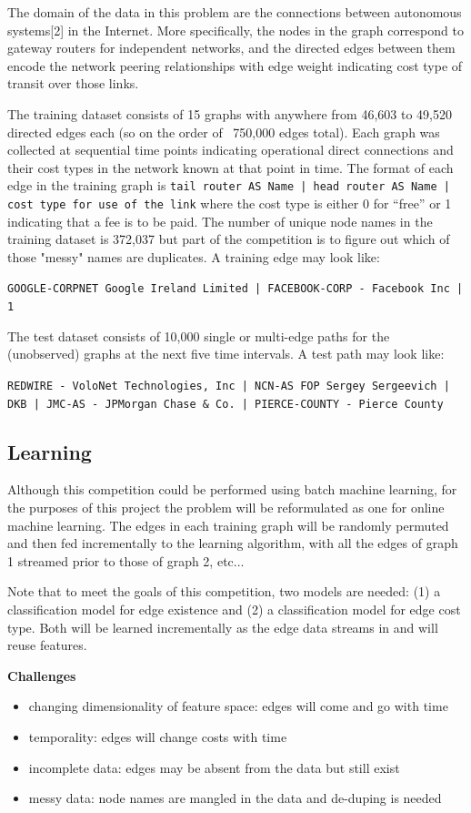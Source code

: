 \documentclass{article} %
\begin{document}
The domain of the data in this problem are the connections between
autonomous systems[2] in the Internet.  More specifically, the nodes in the
graph correspond to gateway routers for independent networks, and the directed
edges between them encode the network peering relationships with edge weight
indicating cost type of
transit over those links.

The training dataset consists of 15 graphs with anywhere from 46,603 to 49,520 directed edges each (so on the
order of ~750,000 edges total).  Each graph was collected at sequential time
points indicating operational direct connections and their cost types in the
network known at that point in time.  The format of each edge in the
training graph is \texttt{tail router AS Name | head router AS
  Name | cost type for use of the link} where the cost type is either 0 for ``free'' or 1
indicating that a fee is to be paid.  The number of unique node names in the
training dataset is 372,037 but part of the competition is to figure out
which of those "messy" names are duplicates.  A training edge may look like:

\texttt{{\small GOOGLE-CORPNET Google Ireland Limited | FACEBOOK-CORP - Facebook Inc | 1}}

The test dataset consists of 10,000 single or multi-edge paths for the (unobserved)
graphs at the next five time intervals.  A test path may look like:

\texttt{{\small REDWIRE - VoloNet Technologies, Inc | NCN-AS FOP Sergey Sergeevich | DKB | JMC-AS - JPMorgan Chase \& Co. | PIERCE-COUNTY - Pierce County}}

\subsection{Learning}

Although this competition could be performed using batch machine learning,
for the purposes of this project the problem will be reformulated as one for
online machine learning.  The edges in each training graph will be randomly
permuted and then fed incrementally to the learning algorithm, with all the
edges of graph 1 streamed prior to those of graph 2, etc...

Note that to meet the goals of this competition, two models are needed: (1)
a classification model for edge existence and (2) a classification model for
edge cost type.  Both will be learned incrementally as the edge data streams in
and will reuse features.

\textbf{Challenges}
\begin{itemize}
\item changing dimensionality of feature space: edges will come and go with time
\item temporality: edges will change costs with time
\item incomplete data: edges may be absent from the data but still exist
\item messy data: node names are mangled in the data and de-duping is needed
\end{itemize}
\end{document}
